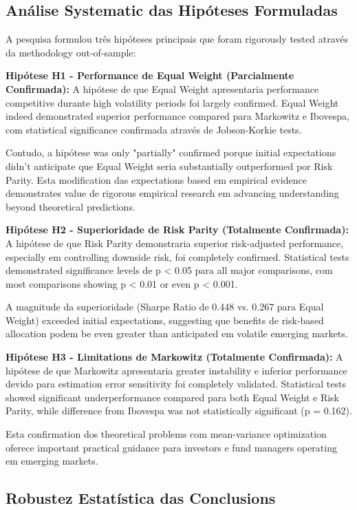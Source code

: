 \subsection{Análise Systematic das Hipóteses Formuladas}

A pesquisa formulou três hipóteses principais que foram rigorously tested através da methodology out-of-sample:

\textbf{Hipótese H1 - Performance de Equal Weight (Parcialmente Confirmada):} A hipótese de que Equal Weight apresentaria performance competitive durante high volatility periods foi largely confirmed. Equal Weight indeed demonstrated superior performance compared para Markowitz e Ibovespa, com statistical significance confirmada através de Jobson-Korkie tests.

Contudo, a hipótese was only "partially" confirmed porque initial expectations didn't anticipate que Equal Weight seria substantially outperformed por Risk Parity. Esta modification das expectations based em empirical evidence demonstrates value de rigorous empirical research em advancing understanding beyond theoretical predictions.

\textbf{Hipótese H2 - Superioridade de Risk Parity (Totalmente Confirmada):} A hipótese de que Risk Parity demonstraria superior risk-adjusted performance, especially em controlling downside risk, foi completely confirmed. Statistical tests demonstrated significance levels de p < 0.05 para all major comparisons, com most comparisons showing p < 0.01 or even p < 0.001.

A magnitude da superioridade (Sharpe Ratio de 0.448 vs. 0.267 para Equal Weight) exceeded initial expectations, suggesting que benefits de risk-based allocation podem be even greater than anticipated em volatile emerging markets.

\textbf{Hipótese H3 - Limitations de Markowitz (Totalmente Confirmada):} A hipótese de que Markowitz apresentaria greater instability e inferior performance devido para estimation error sensitivity foi completely validated. Statistical tests showed significant underperformance compared para both Equal Weight e Risk Parity, while difference from Ibovespa was not statistically significant (p = 0.162).

Esta confirmation dos theoretical problems com mean-variance optimization oferece important practical guidance para investors e fund managers operating em emerging markets.

\subsection{Robustez Estatística das Conclusions}

